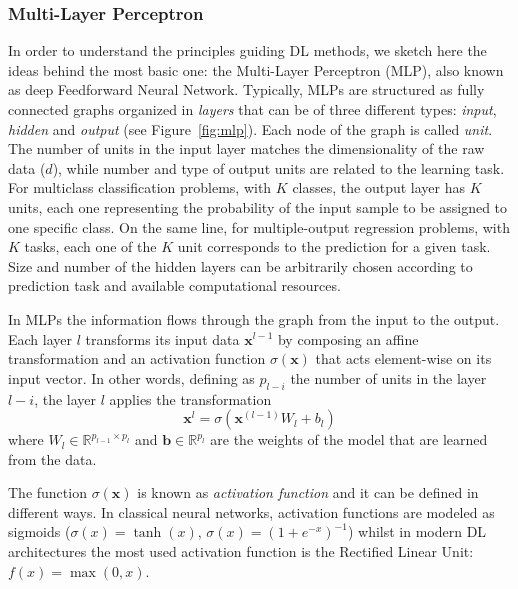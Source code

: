 		\subsubsection{Multi-Layer Perceptron} \label{sec:mlp}
		In order to understand the principles guiding DL methods, we sketch here the ideas behind the most basic one: the Multi-Layer Perceptron (\ac{MLP}), also known as deep Feedforward Neural Network.
	    Typically, MLPs are structured as fully connected graphs organized in \textit{layers} that can be of three different types: \textit{input}, \textit{hidden} and \textit{output} (see Figure~\ref{fig:mlp}).
	    Each node of the graph is called \textit{unit}.
	    The number of units in the input layer matches the dimensionality of the raw data ($d$), while number and type of output units are related to the learning task.
	    For multiclass classification problems, with $K$ classes, the output layer has $K$ units, each one representing the probability of the input sample to be assigned to one specific class.
	    On the same line, for multiple-output regression problems, with $K$ tasks, each one of the $K$ unit corresponds to the prediction for a given task.
	    Size and number of the hidden layers can be arbitrarily chosen according to prediction task and available computational resources.
	    
   	    
	    
	    In MLPs the information flows through the graph from the input to the output.
	    Each layer $l$ transforms its input data $\bm{x}^{l-1}$ by composing an affine transformation and an activation function $\sigma(\bm{x})$ that acts element-wise on its input vector.
	    In other words, defining as $p_{l-i}$ the number of units in the layer $l-i$, the layer $l$ applies the transformation
	    $$
	    \bm{x}^{l} = \sigma(\bm{x}^{(l-1)}W_l+b_l)
	    $$
	    where $W_l \in \mathbb{R}^{p_{l-1} \times p_l}$ and $\bm{b} \in \mathbb{R}^{p_l}$ are the weights of the model that are learned from the data.
	    
	    The function $\sigma(\bm{x})$ is known as \textit{activation function} and it can be defined in different ways.
	    In classical neural networks, activation functions are modeled as sigmoids (\eg $\sigma(x)=\tanh(x)$, $\sigma(x)=(1+e^{-x})^{-1}$) whilst in modern DL architectures the most used activation function is the Rectified Linear Unit: $f(x)=\max(0,x)$.

